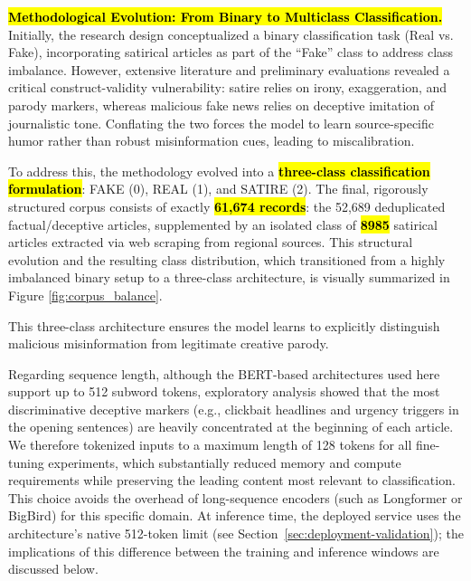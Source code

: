 \documentclass[informatics,article,accept,pdftex,moreauthors]{Definitions/mdpi}
\begin{document}
\textbf{\hl{Methodological Evolution: From Binary to Multiclass Classification.}} 
Initially, the research design conceptualized a binary classification task (Real vs. Fake), incorporating satirical articles as part of the ``Fake'' class to address class imbalance. However, extensive literature and preliminary evaluations revealed a critical construct-validity vulnerability: satire relies on irony, exaggeration, and parody markers, whereas malicious fake news relies on deceptive imitation of journalistic tone. Conflating the two forces the model to learn source-specific humor rather than robust misinformation cues, leading to miscalibration.

To address this, the methodology evolved into a \textbf{\hl{three-class classification formulation}}: FAKE (0), REAL (1), and SATIRE (2). The final, rigorously structured corpus consists of exactly \textbf{\hl{61,674 records}}: the 52,689 deduplicated factual/deceptive articles, supplemented by an isolated class of \textbf{\hl{8985}} satirical articles extracted via web scraping from regional sources. This structural evolution and the resulting class distribution, which transitioned from a highly imbalanced binary setup to a three-class architecture, is visually summarized in Figure \ref{fig:corpus_balance}.

This three-class architecture ensures the model learns to explicitly distinguish malicious misinformation from legitimate creative parody.

Regarding sequence length, although the BERT-based architectures used here support up to 512 subword tokens, exploratory analysis showed that the most discriminative deceptive markers (e.g., clickbait headlines and urgency triggers in the opening sentences) are heavily concentrated at the beginning of each article. We therefore tokenized inputs to a maximum length of 128 tokens for all fine-tuning experiments, which substantially reduced memory and compute requirements while preserving the leading content most relevant to classification. This choice avoids the overhead of long-sequence encoders (such as Longformer or BigBird) for this specific domain. At inference time, the deployed service uses the architecture's native 512-token limit (see Section~\ref{sec:deployment-validation}); the implications of this difference between the training and inference windows are discussed below.
\end{document}
